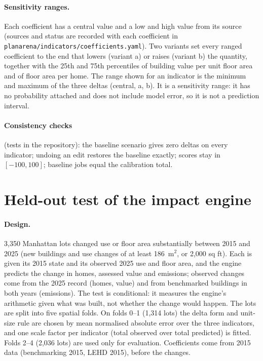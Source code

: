 \documentclass[10pt]{article}
\begin{document}
\paragraph{Sensitivity ranges.} Each coefficient has a central value and a low and high value from its source (sources
and status are recorded with each coefficient in \texttt{planarena/indicators/coefficients.yaml}). Two variants set every ranged coefficient to the end that lowers (variant a)
or raises (variant b) the quantity, together with the 25th and 75th percentiles of building value per unit floor area and
of floor area per home. The range shown for an indicator is the minimum and maximum of the three deltas (central, a,
b). It is a sensitivity range: it has no probability attached and does not include model error, so it is not a
prediction interval.

\paragraph{Consistency checks} (tests in the repository): the baseline scenario gives zero deltas on every indicator;
undoing an edit restores the baseline exactly; scores stay in $[-100, 100]$; baseline jobs equal the calibration total.

\section{Held-out test of the impact engine}\label{s:impact-test}

\paragraph{Design.} 3{,}350 Manhattan lots changed use or floor area substantially between 2015 and 2025 (new
buildings and use changes of at least 186~m$^2$, or 2,000 sq ft). Each is given its 2015 state and its observed 2025 use and floor
area, and the engine predicts the change in homes, assessed value and emissions; observed changes come from the 2025
record (homes, value) and from benchmarked buildings in both years (emissions). The test is conditional: it measures
the engine's arithmetic given what was built, not whether the change would happen. The lots are split into five
spatial folds. On folds 0--1 (1{,}314 lots) the delta form and unit-size rule are chosen by mean normalised absolute
error over the three indicators, and one scale factor per indicator (total observed over total predicted) is fitted.
Folds 2--4 (2{,}036 lots) are used only for evaluation. Coefficients come from 2015 data (benchmarking 2015, LEHD
2015), before the changes.
\end{document}
